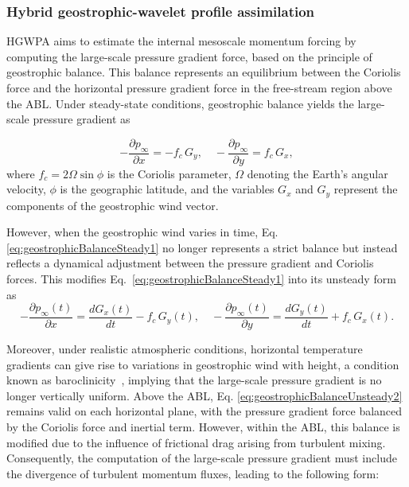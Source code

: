 \subsubsection{Hybrid geostrophic-wavelet profile assimilation}
\label{sec:geoDevelop}
HGWPA aims to estimate the internal mesoscale momentum forcing by computing the large-scale pressure gradient force, based on the principle of geostrophic balance. This balance represents an equilibrium between the Coriolis force and the horizontal pressure gradient force in the free-stream region above the ABL. Under steady-state conditions, geostrophic balance yields the large-scale pressure gradient as

\begin{equation}
    -\frac{\partial p_\infty}{\partial x} = -f_c\,G_y, 
    \quad 
    -\frac{\partial p_\infty}{\partial y} = f_c\,G_x,
    \label{eq:geostrophicBalanceSteady1}
\end{equation}
where \( f_c = 2\Omega \sin\phi \) is the Coriolis parameter, \( \Omega \) denoting the Earth's angular velocity, \( \phi \) is the geographic latitude, and the variables \( G_x \) and \( G_y \) represent the components of the geostrophic wind vector.

However, when the geostrophic wind varies in time, Eq. \ref{eq:geostrophicBalanceSteady1} no longer represents a strict balance but instead reflects a dynamical adjustment between the pressure gradient and Coriolis forces. This modifies Eq.~\eqref{eq:geostrophicBalanceSteady1} into its unsteady form as
\begin{equation}
    -\frac{\partial p_\infty(t)}{\partial x} = \frac{dG_x(t)}{dt} - f_c\,G_y(t), 
    \quad 
    -\frac{\partial p_\infty(t)}{\partial y} = \frac{dG_y(t)}{dt} + f_c\,G_x(t).
    \label{eq:geostrophicBalanceUnsteady2}
\end{equation}

Moreover, under realistic atmospheric conditions, horizontal temperature gradients can give rise to variations in geostrophic wind with height, a condition known as baroclinicity~\citep{sorbjan2004large,holton2013introduction,floors2015effect,momen2018modulation}, implying that the large-scale pressure gradient is no longer vertically uniform. Above the ABL, Eq. \ref{eq:geostrophicBalanceUnsteady2} remains valid on each horizontal plane, with the pressure gradient force balanced by the Coriolis force and inertial term. However, within the ABL, this balance is modified due to the influence of frictional drag arising from turbulent mixing. Consequently, the computation of the large-scale pressure gradient must include the divergence of turbulent momentum fluxes, leading to the following form:

